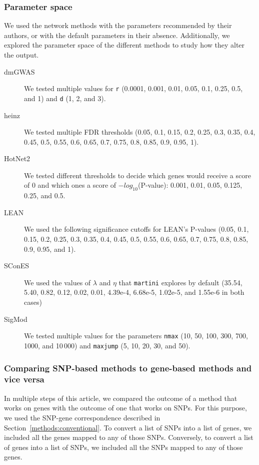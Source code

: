\documentclass[10pt,letterpaper]{article}
\begin{document}
\subsubsection{Parameter space}
\label{methods:parameters}

We used the network methods with the parameters recommended by their authors, or with the default parameters in their absence. Additionally, we explored the parameter space of the different methods to study how they alter the output.

\begin{description}
\item[{dmGWAS}] We tested multiple values for \texttt{r} (0.0001, 0.001, 0.01, 0.05, 0.1, 0.25, 0.5, and 1) and \texttt{d} (1, 2, and 3). 
\item[{heinz}] We tested multiple FDR thresholds (0.05, 0.1, 0.15, 0.2, 0.25, 0.3, 0.35, 0.4, 0.45, 0.5, 0.55, 0.6, 0.65, 0.7, 0.75, 0.8, 0.85, 0.9, 0.95, 1).
\item[{HotNet2}] We tested different thresholds to decide which genes would receive a score of 0 and which ones a score of $-log_{10}$(P-value): 0.001, 0.01, 0.05, 0.125, 0.25, and 0.5.
\item[{LEAN}] We used the following significance cutoffs for LEAN's P-values (0.05, 0.1, 0.15, 0.2, 0.25, 0.3, 0.35, 0.4, 0.45, 0.5, 0.55, 0.6, 0.65, 0.7, 0.75, 0.8, 0.85, 0.9, 0.95, and 1).
\item[{SConES}] We used the values of $\lambda$ and $\eta$ that \texttt{martini} explores by default (35.54, 5.40, 0.82, 0.12, 0.02, 0.01, 4.39e-4, 6.68e-5, 1.02e-5, and 1.55e-6 in both cases)
\item[{SigMod}] We tested multiple values for the parameters \texttt{nmax} (10, 50, 100, 300, 700, 1000, and 10\,000) and \texttt{maxjump} (5, 10, 20, 30, and 50).
\end{description}

\subsubsection{Comparing SNP-based methods to gene-based methods and vice versa}
\label{methods:snp2gene}

In multiple steps of this article, we compared the outcome of a method that works on genes with the outcome of one that works on SNPs. For this purpose, we used the SNP-gene correspondence described in Section~\ref{methods:conventional}. To convert a list of SNPs into a list of genes, we included all the genes mapped to any of those SNPs. Conversely, to convert a list of genes into a list of SNPs, we included all the SNPs mapped to any of those genes.
\end{document}
